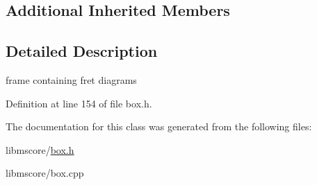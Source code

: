 \subsection*{Additional Inherited Members}


\subsection{Detailed Description}
frame containing fret diagrams 

Definition at line 154 of file box.\+h.



The documentation for this class was generated from the following files\+:\begin{DoxyCompactItemize}
\item 
libmscore/\hyperlink{box_8h}{box.\+h}\item 
libmscore/box.\+cpp\end{DoxyCompactItemize}
